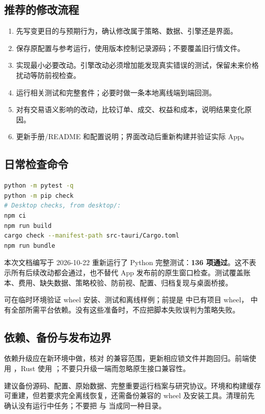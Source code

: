\documentclass[UTF8,fontset=none,11pt]{ctexart}
\let\originalsubsection\subsection
\renewcommand{\subsection}{\Needspace{8\baselineskip}\originalsubsection}
\begin{document}
\subsection{推荐的修改流程}
\begin{enumerate}
\item 先写变更目的与预期行为，确认修改属于策略、数据、引擎还是界面。
\item 保存原配置与参考运行，使用版本控制记录源码；不要覆盖旧行情文件。
\item 实现最小必要改动。引擎改动必须增加能发现真实错误的测试，保留未来价格扰动等防前视检查。
\item 运行相关测试和完整套件；必要时做一条本地离线端到端回测。
\item 对有交易语义影响的改动，比较订单、成交、权益和成本，说明结果变化原因。
\item 更新手册/README 和配置说明；界面改动后重新构建并验证实际 App。
\end{enumerate}

\subsection{日常检查命令}
\begin{lstlisting}[language=bash]
python -m pytest -q
python -m pip check
# Desktop checks, from desktop/:
npm ci
npm run build
cargo check --manifest-path src-tauri/Cargo.toml
npm run bundle
\end{lstlisting}
本次文档编写于 2026-10-22 重新运行了 Python 完整测试：\textbf{136 项通过}。这不表示所有后续改动都会通过，也不替代 App 发布前的原生窗口检查。测试覆盖账本、费用、缺失数据、策略校验、防前视、配置、归档复现与桌面桥接。

 可在临时环境验证 wheel 安装、测试和离线样例；前提是  中已有项目 wheel， 中有全部所需平台依赖。没有这些准备时，不应把脚本失败误判为策略失败。

\subsection{依赖、备份与发布边界}
依赖升级应在新环境中做，核对  的兼容范围，更新相应锁文件并跑回归。前端使用 ，Rust 使用 ；不要只升级一端而忽略原生接口兼容性。

建议备份源码、配置、原始数据、完整重要运行档案与研究协议。环境和构建缓存可重建，但若要求完全离线恢复，还需备份兼容的 wheel 及安装工具。清理前先确认没有运行中任务；不要把  与  当成同一种目录。
\end{document}
